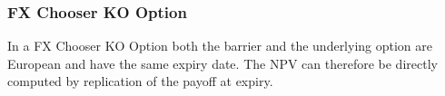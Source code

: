 \subsubsection{FX Chooser KO Option}
\label{pricing:fx_chooserkooption}

In a FX Chooser KO Option both the barrier and the underlying option are European and have the same expiry
date. The NPV can therefore be directly computed by replication of the payoff at expiry.



